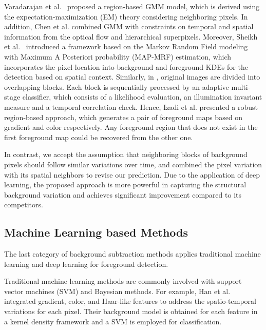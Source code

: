 \documentclass[journal]{IEEEtran}
\begin{document}
Varadarajan et al.\ \cite{2015_PR_Varadarajan20153488} proposed a region-based GMM model,
which is derived using the expectation-maximization (EM) theory considering neighboring pixels.
In addition, 
Chen et al. \cite{2017_TPAMI_GANGWANG} combined GMM with constraints on temporal and spatial information from the optical flow and hierarchical superpixels.
Moreover, 
Sheikh et al.\ \cite{Sheikh2005Bayesian} introduced a framework based on the Markov Random Field modeling with Maximum A Posteriori 
probability (MAP-MRF) estimation, which incorporates the pixel location into background and foreground KDEs for the detection based on spatial context.
Similarly, in \cite{Reddy2010Robust}, original images are divided into overlapping blocks. Each block is sequentially processed by an adaptive multi-stage classifier, which consists of a likelihood evaluation, an illumination invariant measure and a temporal correlation check.
Hence, Izadi et al.\cite{Izadi2008Robust} presented a robust region-based approach, which generates a pair of foreground maps based on gradient and color respectively. Any foreground region that does not exist in the first foreground map could be recovered from the other one.

In contrast, we accept the assumption that neighboring blocks of background pixels should follow similar variations over time, 
and combined the pixel variation with its spatial neighbors to revise our prediction. 
Due to the application of deep learning, the proposed approach is more powerful in capturing the structural background variation and achieves significant improvement compared to its competitors.
%
%
%
\subsection{Machine Learning based Methods}
The last category of background subtraction methods applies traditional machine learning and deep learning for foreground detection.

%
Traditional machine learning methods are commonly involved with support vector machines (SVM)\cite{Chen2011}\cite{Han2012} and Bayesian methods\cite{Sheikh2005Bayesian}\cite{2012_TIP_OP_6099616}\cite{Zhang2014Statis}. 
For example, Han et al. \cite{Han2012} integrated gradient, color, and Haar-like features to address the spatio-temporal variations for each pixel. 
Their background model is obtained for each feature in a kernel density framework and a SVM is employed for classification.
\end{document}
